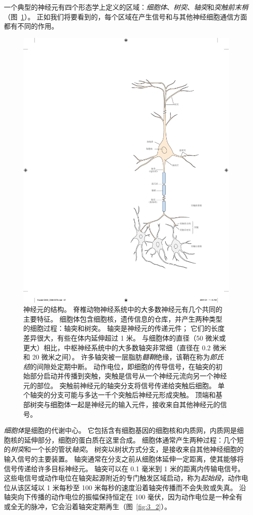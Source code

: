 一个典型的神经元有四个形态学上定义的区域：\textit{细胞体}、\textit{树突}、\textit{轴突}和\textit{突触前末梢}（图~\ref{fig:3_1}）。 
正如我们将要看到的，每个区域在产生信号和与其他神经细胞通信方面都有不同的作用。


\begin{figure}[htbp]
	\centering
	\includegraphics[width=0.6\linewidth]{chap03/fig_3_1}
	\caption{神经元的结构。 
		脊椎动物神经系统中的大多数神经元有几个共同的主要特征。
		细胞体包含细胞核，遗传信息的仓库，并产生两种类型的细胞过程：轴突和树突。 
		轴突是神经元的传递元件；
		它们的长度差异很大，有些在体内延伸超过 1 米。 
		与细胞体的直径（50 微米或更大）相比，中枢神经系统中的大多数轴突非常细（直径在 0.2 微米和 20 微米之间）。 
		许多轴突被一层脂肪\textit{髓鞘}绝缘，该鞘在称为\textit{郎氏结}的间隙处定期中断。 
		动作电位，即细胞的传导信号，在轴突的初始部分启动并传播到突触，突触是信号从一个神经元流向另一个神经元的部位。 
		突触前神经元的轴突分支将信号传递给突触后细胞。 
		单个轴突的分支可能与多达一千个突触后神经元形成突触。 
		顶端和基部树突与细胞体一起是神经元的输入元件，接收来自其他神经元的信号。}
	\label{fig:3_1}
\end{figure}


\textit{细胞体}是细胞的代谢中心。 
它包括含有细胞基因的细胞核和内质网，内质网是细胞核的延伸部分，细胞的蛋白质在这里合成。
细胞体通常产生两种过程：几个短的\textit{树突}和一个长的管状\textit{轴突}。 
树突以树状方式分支，是接收来自其他神经细胞的输入信号的主要装置。 
轴突通常在分支之前从细胞体延伸一定距离，使其能够将信号传递给许多目标神经元。
轴突可以在 0.1 毫米到 1 米的距离内传输电信号。 
这些电信号或动作电位在轴突起源附近的专门触发区域启动，称为\textit{起始段}，动作电位从该区域以 1 米每秒至 100 米每秒的速度沿着轴突传播而不会失败或失真。 
沿轴突向下传播的动作电位的振幅保持恒定在 100 毫伏，因为动作电位是一种全有或全无的脉冲，它会沿着轴突定期再生（图~\ref{fig:3_2}）。


